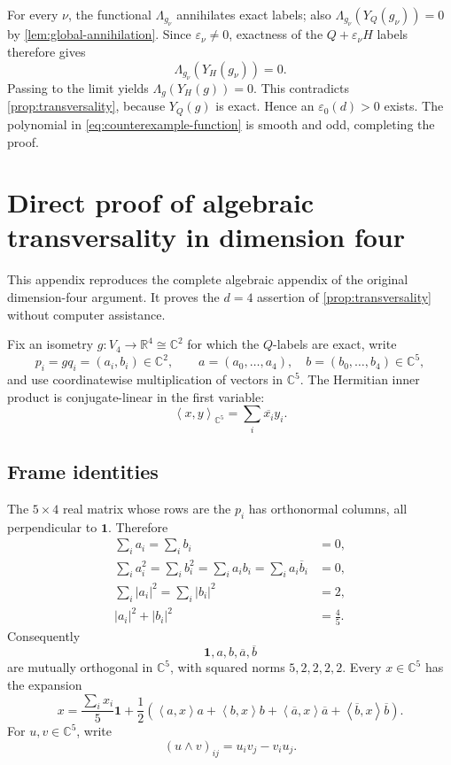 \documentclass[11pt,reqno]{amsart}
\theoremstyle{remark}
\newcommand{\R}{\mathbb R}
\newcommand{\C}{\mathbb C}
\newcommand{\one}{\mathbf 1}
\newcommand{\eps}{\varepsilon}
\newcommand{\ip}[2]{\left\langle #1,#2\right\rangle}
\newcommand{\abs}[1]{\left\lvert #1\right\rvert}
\begin{document}
For every $\nu$, the functional $\Lambda_{g_\nu}$ annihilates exact labels;
also $\Lambda_{g_\nu}(Y_Q(g_\nu))=0$ by
\cref{lem:global-annihilation}.  Since $\eps_\nu\ne0$, exactness of the
$Q+\eps_\nu H$ labels therefore gives
\[
 \Lambda_{g_\nu}(Y_H(g_\nu))=0.
\]
Passing to the limit yields $\Lambda_g(Y_H(g))=0$.  This contradicts
\cref{prop:transversality}, because $Y_Q(g)$ is exact.  Hence an
$\eps_0(d)>0$ exists.  The polynomial in
\eqref{eq:counterexample-function} is smooth and odd, completing the proof.

\appendix

\section{Direct proof of algebraic transversality in dimension four}
\label{app:d4-transversality}

This appendix reproduces the complete algebraic appendix of the original
dimension-four argument.  It proves the $d=4$ assertion of
\cref{prop:transversality} without computer assistance.

Fix an isometry $g:V_4\to\R^4\cong\C^2$ for which the $Q$-labels are exact,
write
\[
p_i=gq_i=(a_i,b_i)\in\C^2,
\qquad
a=(a_0,\dots,a_4),\quad b=(b_0,\dots,b_4)\in\C^5,
\]
and use coordinatewise multiplication of vectors in $\C^5$.  The Hermitian
inner product is conjugate-linear in the first variable:
\[
\ip{x}{y}_{\C^5}=\sum_i\overline{x_i}y_i.
\]

\subsection{Frame identities}

The $5\times4$ real matrix whose rows are the $p_i$ has orthonormal columns,
all perpendicular to $\one$.  Therefore
\begin{align}
\sum_i a_i=\sum_i b_i&=0,\label{eq:frame-sums}\\
\sum_i a_i^2=\sum_i b_i^2
=\sum_i a_ib_i=\sum_i a_i\overline b_i&=0,\label{eq:frame-orthog}\\
\sum_i\abs{a_i}^2=\sum_i\abs{b_i}^2&=2,\label{eq:frame-norms}\\
\abs{a_i}^2+\abs{b_i}^2&=\frac45.\label{eq:row-norm}
\end{align}
Consequently
\[
\one,a,b,\overline a,\overline b
\]
are mutually orthogonal in $\C^5$, with squared norms $5,2,2,2,2$.
Every $x\in\C^5$ has the expansion
\begin{equation}\label{eq:basis-expansion}
x=\frac{\sum_i x_i}{5}\one
+\frac12\left(
\ip{a}{x}a+\ip{b}{x}b
+\ip{\overline a}{x}\overline a
+\ip{\overline b}{x}\overline b
\right).
\end{equation}
For $u,v\in\C^5$, write
\[
(u\wedge v)_{ij}=u_iv_j-v_iu_j.
\]
\end{document}

